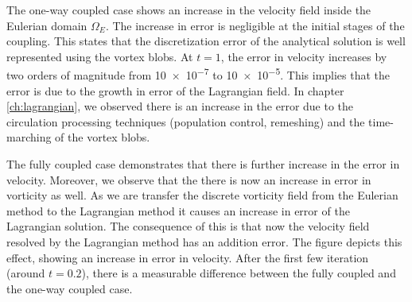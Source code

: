 The one-way coupled case shows an increase in the velocity field inside the Eulerian domain $\Omega_E$. The increase in error is negligible at the initial stages of the coupling. This states that the discretization error of the analytical solution is well represented using the vortex blobs. At $t=1$, the error in velocity increases by two orders of magnitude from \num{10e-7} to \num{10e-5}. This implies that the error is due to the growth in error of the Lagrangian field. In chapter \ref{ch:lagrangian}, we observed there is an increase in the error due to the circulation processing techniques (population control, remeshing) and the time-marching of the vortex blobs.

The fully coupled case demonstrates that there is further increase in the error in velocity. Moreover, we observe that the there is now an increase in error in vorticity as well. As we are transfer the discrete vorticity field from the Eulerian method to the Lagrangian method it causes an increase in error of the Lagrangian solution. The consequence of this is that now the velocity field resolved by the Lagrangian method has an addition error. The figure depicts this effect, showing an increase in error in velocity. After the first few iteration (around $t=0.2$), there is a measurable difference between the fully coupled and the one-way coupled case. 


